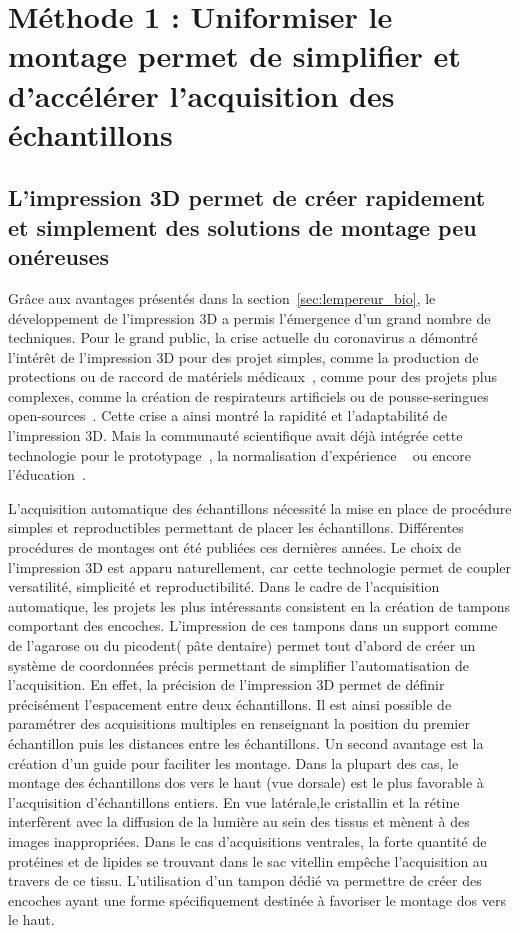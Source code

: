 \documentclass[\main/main.tex]{subfiles}
\begin{document}
\chapter{
    \label{sec:montage}
    Méthode 1 : Uniformiser le montage permet de simplifier et d'accélérer l'acquisition des échantillons
    }


    \section{L'impression 3D permet de créer rapidement et simplement des solutions de montage peu onéreuses}
    
%
Grâce aux avantages présentés dans la section~\ref{sec:lempereur_bio}, le développement de l'impression 3D a permis l'émergence d'un grand nombre de techniques.
%
Pour le grand public, la crise actuelle du coronavirus a démontré l'intérêt de l'impression 3D
pour des projet simples, comme la production de protections ou de raccord de matériels médicaux~\cite{callahan_2020,ishack_2020,wesemann_2020}, comme pour des projets plus complexes, comme la création de respirateurs artificiels ou de pousse-seringues open-sources~\cite{na_website_nda}.
%
Cette crise a ainsi montré la rapidité et l'adaptabilité de l'impression 3D.
%
Mais la communauté scientifique avait déjà intégrée cette technologie pour le prototypage~\cite{he_2016}, la normalisation d'expérience ~\cite{pinskiy_2013} ou encore l'éducation~\cite{maiachagas_2017}.
    
%
L'acquisition automatique des échantillons nécessité la mise en place de procédure simples
et reproductibles permettant de placer les échantillons.
%
Différentes procédures de montages ont été publiées ces dernières années.
%
Le choix de l'impression 3D est apparu naturellement, car cette technologie permet de coupler versatilité, simplicité et reproductibilité.
%
Dans le cadre de l'acquisition automatique, les projets les plus intéressants consistent en la création de tampons comportant des encoches.
%
L'impression de ces tampons dans un support comme de l'agarose ou du picodent( pâte dentaire) permet tout d'abord de créer un système de coordonnées précis
permettant de simplifier l'automatisation de l'acquisition. En effet, la précision de l'impression 3D permet de définir précisément l'espacement entre deux échantillons.
Il est ainsi possible de paramétrer des acquisitions multiples en renseignant la position du premier échantillon puis les distances entre les échantillons.
%
Un second avantage est la création d'un guide pour faciliter les montage. Dans la plupart des cas, le montage des échantillons dos vers le haut (vue dorsale)
est le plus favorable à l'acquisition d'échantillons entiers. En vue latérale,le cristallin et la rétine interfèrent avec la diffusion de la lumière au sein des tissus et mènent à des images inappropriées.
Dans le cas d'acquisitions ventrales, la forte quantité de protéines et de lipides se trouvant dans le sac vitellin empêche l'acquisition au travers de ce tissu.
%
L'utilisation d'un tampon dédié va permettre de créer des encoches ayant une forme spécifiquement destinée à favoriser le montage dos vers le haut.
\end{document}
